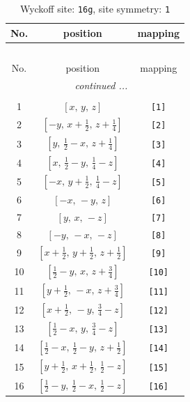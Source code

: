 \documentclass[fleqn,8pt]{jsarticle}
\begin{document}
\begin{longtable}{ccc}
\caption{Wyckoff site: {\tt 16g}, site symmetry: {\tt 1}}
 \\
 \hline \hline
No. & position & mapping \\ \hline \endfirsthead

\multicolumn{2}{l}{\tablename\ \thetable{}} \\
 \hline \hline
No. & position & mapping \\ \hline \endhead

 \hline \hline
\multicolumn{2}{r}{\footnotesize\it continued ...} \\ \endfoot

 \hline \hline
\multicolumn{2}{r}{} \\ \endlastfoot

1 & $\left[ x,\, y,\, z \right]$ & {\tt [1]} \\ \hline
2 & $\left[ - y,\, x + \frac{1}{2},\, z + \frac{1}{4} \right]$ & {\tt [2]} \\ \hline
3 & $\left[ y,\, \frac{1}{2} - x,\, z + \frac{1}{4} \right]$ & {\tt [3]} \\ \hline
4 & $\left[ x,\, \frac{1}{2} - y,\, \frac{1}{4} - z \right]$ & {\tt [4]} \\ \hline
5 & $\left[ - x,\, y + \frac{1}{2},\, \frac{1}{4} - z \right]$ & {\tt [5]} \\ \hline
6 & $\left[ - x,\, - y,\, z \right]$ & {\tt [6]} \\ \hline
7 & $\left[ y,\, x,\, - z \right]$ & {\tt [7]} \\ \hline
8 & $\left[ - y,\, - x,\, - z \right]$ & {\tt [8]} \\ \hline
9 & $\left[ x + \frac{1}{2},\, y + \frac{1}{2},\, z + \frac{1}{2} \right]$ & {\tt [9]} \\ \hline
10 & $\left[ \frac{1}{2} - y,\, x,\, z + \frac{3}{4} \right]$ & {\tt [10]} \\ \hline
11 & $\left[ y + \frac{1}{2},\, - x,\, z + \frac{3}{4} \right]$ & {\tt [11]} \\ \hline
12 & $\left[ x + \frac{1}{2},\, - y,\, \frac{3}{4} - z \right]$ & {\tt [12]} \\ \hline
13 & $\left[ \frac{1}{2} - x,\, y,\, \frac{3}{4} - z \right]$ & {\tt [13]} \\ \hline
14 & $\left[ \frac{1}{2} - x,\, \frac{1}{2} - y,\, z + \frac{1}{2} \right]$ & {\tt [14]} \\ \hline
15 & $\left[ y + \frac{1}{2},\, x + \frac{1}{2},\, \frac{1}{2} - z \right]$ & {\tt [15]} \\ \hline
16 & $\left[ \frac{1}{2} - y,\, \frac{1}{2} - x,\, \frac{1}{2} - z \right]$ & {\tt [16]} \\
\end{longtable}
\end{document}
